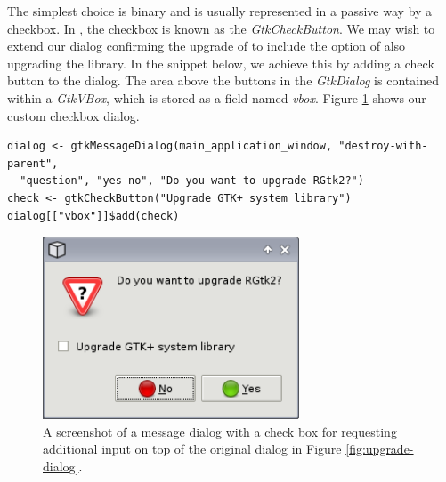 \documentclass[article]{jss}
\begin{document}
The simplest choice is binary and is usually represented in a passive way 
by a checkbox. In , the checkbox is known as
the \emph{GtkCheckButton}. We may wish to extend our dialog confirming the
upgrade of  to include the option of also upgrading the  
library. In the snippet below, we achieve this by adding a check button to the dialog. 
The area above the buttons in the \emph{GtkDialog} is contained within a 
\emph{GtkVBox}, which is stored as a field named \emph{vbox}. Figure 
\ref{fig:checkbox-dialog} shows our custom checkbox dialog.
\begin{verbatim}
dialog <- gtkMessageDialog(main_application_window, "destroy-with-parent", 
  "question", "yes-no", "Do you want to upgrade RGtk2?")
check <- gtkCheckButton("Upgrade GTK+ system library")
dialog[["vbox"]]$add(check)
\end{verbatim}

\begin{figure}
\begin{center}
\includegraphics[width=3in]{checkbox-dialog.png}
\caption{\label{fig:checkbox-dialog}A screenshot of a message dialog with a 
check box for requesting additional input on top of the
original dialog in Figure \ref{fig:upgrade-dialog}.}
\end{center}
\end{figure}
\end{document}
